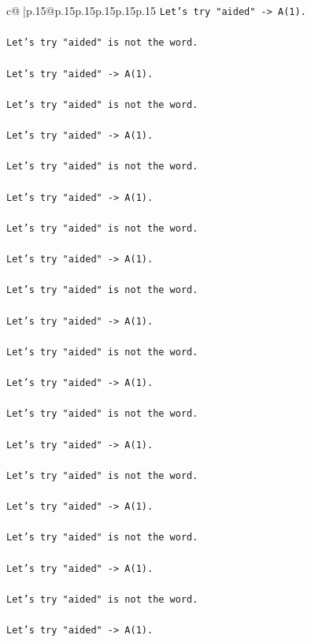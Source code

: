 \documentclass{article}
\begin{document}
{\begin{supertabular}{c@{$\;$}|p{.15\linewidth}@{}p{.15\linewidth}p{.15\linewidth}p{.15\linewidth}p{.15\linewidth}p{.15\linewidth}}
{{{\texttt{Let's try "aided" {-}> A(1).} \\
\\ 
\texttt{Let's try "aided" is not the word.} \\
\\ 
\texttt{Let's try "aided" {-}> A(1).} \\
\\ 
\texttt{Let's try "aided" is not the word.} \\
\\ 
\texttt{Let's try "aided" {-}> A(1).} \\
\\ 
\texttt{Let's try "aided" is not the word.} \\
\\ 
\texttt{Let's try "aided" {-}> A(1).} \\
\\ 
\texttt{Let's try "aided" is not the word.} \\
\\ 
\texttt{Let's try "aided" {-}> A(1).} \\
\\ 
\texttt{Let's try "aided" is not the word.} \\
\\ 
\texttt{Let's try "aided" {-}> A(1).} \\
\\ 
\texttt{Let's try "aided" is not the word.} \\
\\ 
\texttt{Let's try "aided" {-}> A(1).} \\
\\ 
\texttt{Let's try "aided" is not the word.} \\
\\ 
\texttt{Let's try "aided" {-}> A(1).} \\
\\ 
\texttt{Let's try "aided" is not the word.} \\
\\ 
\texttt{Let's try "aided" {-}> A(1).} \\
\\ 
\texttt{Let's try "aided" is not the word.} \\
\\ 
\texttt{Let's try "aided" {-}> A(1).} \\
\\ 
\texttt{Let's try "aided" is not the word.} \\
\\ 
\texttt{Let's try "aided" {-}> A(1).} \\
}}}
\end{supertabular}}
\end{document}
